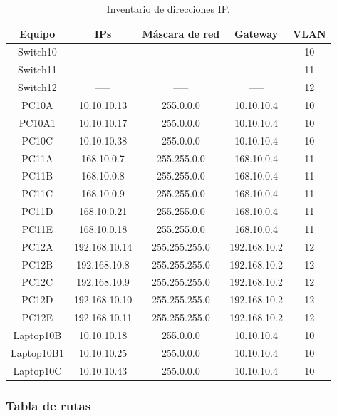 \documentclass[spanish,12pt,letterpaper]{article}
\begin{document}
\begin{table}[H]
  \centering
  \begin{tabular}{| c | c | c | c | c |}\hline
    Equipo & IPs & Máscara de red & Gateway & VLAN \\ \hline
    Switch10 & -----  & ----- & ----- & 10 \\ \hline 
    Switch11 & -----  & ----- & ----- & 11 \\ \hline
    Switch12 & -----  & ----- & ----- & 12 \\ \hline
    PC10A  & 10.10.10.13  & 255.0.0.0 & 10.10.10.4 & 10  \\ \hline
    PC10A1 & 10.10.10.17  & 255.0.0.0 & 10.10.10.4 & 10 \\ \hline
    PC10C  & 10.10.10.38  & 255.0.0.0 & 10.10.10.4 & 10 \\ \hline
    PC11A  & 168.10.0.7  & 255.255.0.0 & 168.10.0.4 & 11 \\ \hline
    PC11B  & 168.10.0.8  & 255.255.0.0 & 168.10.0.4 & 11 \\ \hline
    PC11C  & 168.10.0.9 & 255.255.0.0 & 168.10.0.4 & 11 \\ \hline
    PC11D  & 168.10.0.21 & 255.255.0.0 & 168.10.0.4 & 11 \\ \hline
    PC11E  & 168.10.0.18 & 255.255.0.0 & 168.10.0.4 & 11 \\ \hline
    PC12A  & 192.168.10.14 & 255.255.255.0 & 192.168.10.2 & 12 \\ \hline
    PC12B  & 192.168.10.8  & 255.255.255.0 & 192.168.10.2 & 12 \\ \hline
    PC12C  & 192.168.10.9  & 255.255.255.0 & 192.168.10.2 & 12 \\ \hline
    PC12D  & 192.168.10.10 & 255.255.255.0 & 192.168.10.2 & 12 \\ \hline
    PC12E  & 192.168.10.11 & 255.255.255.0 & 192.168.10.2 & 12 \\ \hline
    Laptop10B  & 10.10.10.18 & 255.0.0.0 & 10.10.10.4 & 10 \\ \hline
    Laptop10B1  & 10.10.10.25 & 255.0.0.0 & 10.10.10.4 & 10 \\ \hline
    Laptop10C  & 10.10.10.43 & 255.0.0.0 & 10.10.10.4 & 10 \\ \hline
  \end{tabular}
  \caption{Inventario de direcciones IP.}
\end{table}


\subsubsection{Tabla de rutas}
\end{document}
